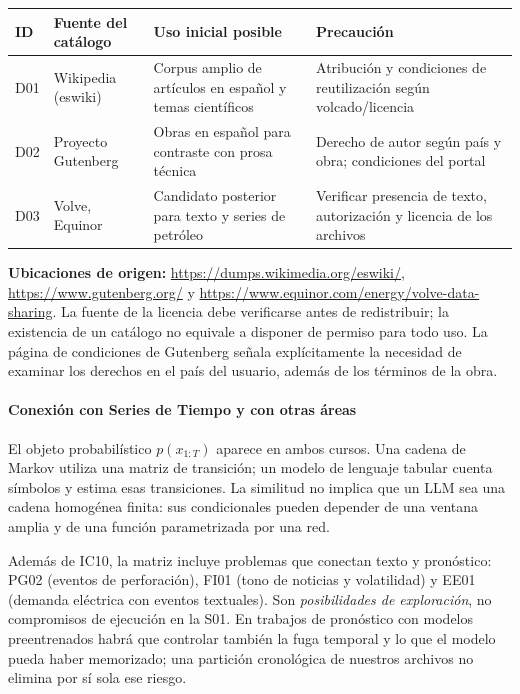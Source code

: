 \begin{center}\small
\begin{tabularx}{\linewidth}{@{}p{1.2cm}p{3.3cm}Xp{2.6cm}@{}}\toprule
ID & Fuente del catálogo & Uso inicial posible & Precaución\\\midrule
D01 & Wikipedia (eswiki) & Corpus amplio de artículos en español y temas científicos & Atribución y condiciones de reutilización según volcado/licencia\\
D02 & Proyecto Gutenberg & Obras en español para contraste con prosa técnica & Derecho de autor según país y obra; condiciones del portal\\
D03 & Volve, Equinor & Candidato posterior para texto y series de petróleo & Verificar presencia de texto, autorización y licencia de los archivos\\\bottomrule
\end{tabularx}
\end{center}
\textbf{Ubicaciones de origen:} \url{https://dumps.wikimedia.org/eswiki/},
\url{https://www.gutenberg.org/} y
\url{https://www.equinor.com/energy/volve-data-sharing}.
La fuente de la licencia debe verificarse antes de redistribuir; la existencia
de un catálogo no equivale a disponer de permiso para todo uso. La página de
condiciones de Gutenberg señala explícitamente la necesidad de examinar los
derechos en el país del usuario, además de los términos de la obra.

\paragraph{Conexión con Series de Tiempo y con otras áreas}

El objeto probabilístico $p(x_{1:T})$ aparece en ambos cursos. Una cadena de
Markov utiliza una matriz de transición; un modelo de lenguaje tabular cuenta
símbolos y estima esas transiciones. La similitud no implica que un LLM sea una
cadena homogénea finita: sus condicionales pueden depender de una ventana amplia
y de una función parametrizada por una red.

Además de IC10, la matriz incluye problemas que conectan texto y pronóstico:
PG02 (eventos de perforación), FI01 (tono de noticias y volatilidad) y EE01
(demanda eléctrica con eventos textuales). Son \emph{posibilidades de exploración},
no compromisos de ejecución en la S01. En trabajos de pronóstico con modelos
preentrenados habrá que controlar también la fuga temporal y lo que el modelo
pueda haber memorizado; una partición cronológica de nuestros archivos no elimina
por sí sola ese riesgo.

